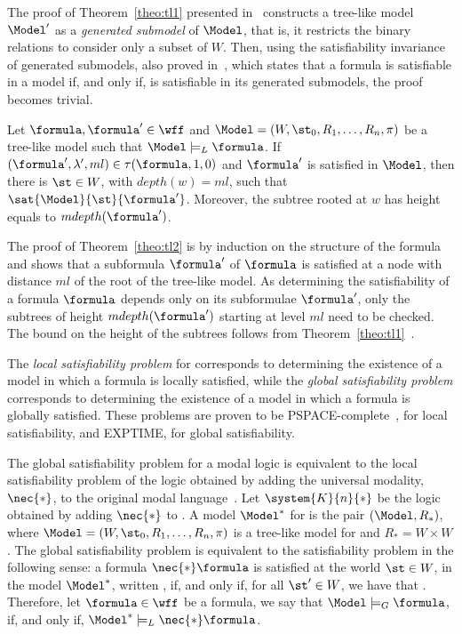 \begin{example}
    The proof of Theorem~\ref{theo:tl1} presented in~\cite{blackburn2002modal}
    constructs a tree-like model $\Model'$ as a \emph{generated submodel} of
    $\Model$, that is, it restricts the binary relations to consider only a
    subset of $W$. Then, using the satisfiability invariance of generated
    submodels, also proved in~\cite{blackburn2002modal}, which states that a
    formula is satisfiable in a model if, and only if, is satisfiable in its
    generated submodels, the proof becomes trivial.

    \begin{theorem}%
        \label{theo:tl2}
        Let $\formula, \formula' \in \wff$ and $\Model = (W, \st_0, R_1, \ldots,
        R_n, \pi)$ be a tree-like model such that $\Model \models_L \formula$. If
        $(\formula', \lambda', ml) \in \tau(\formula, 1, 0)$ and
        $\formula'$ is satisfied in $\Model$, then there is $\st \in W$, with
        $depth(w) = ml$, such that $\sat{\Model}{\st}{\formula'}$. Moreover,
        the subtree rooted at $w$ has height equals to $mdepth(\formula')$.
    \end{theorem}

    The proof of Theorem~\ref{theo:tl2} is by induction on the structure of the
    formula and shows that a subformula $\formula'$ of $\formula$ is satisfied
    at a node with distance $ml$ of the root of the tree-like model. As
    determining the satisfiability of a formula $\formula$ depends only on its
    subformulae $\formula'$, only the subtrees of height $mdepth(\formula')$
    starting at level $ml$ need to be checked. The bound on the height of the
    subtrees follows from Theorem~\ref{theo:tl1}~\cite{nalon2015modal}.
\end{example}

The \emph{local satisfiability problem} for  corresponds to
determining the existence of a model in which a formula is locally satisfied,
while the \emph{global satisfiability problem} corresponds to determining the
existence of a model in which a formula is globally satisfied. These problems
are proven to be PSPACE-complete~\cite{Spaan:coml}, for local satisfiability,
and EXPTIME, for global satisfiability\cite{Spaan:coml}.

The global satisfiability problem for a modal logic is equivalent to the local
satisfiability problem of the logic obtained by adding the universal modality,
$\nec{*}$, to the original modal language~\cite{goranko1992using}. Let
$\system{K}{n}{*}$ be the logic obtained by adding $\nec{*}$ to .
A model $\Model^*$ for  is the pair $(\Model, R_*)$, where
$\Model = (W, \st_0, R_1, \ldots, R_n, \pi)$ is a tree-like model for
 and $R_* = W \times W$. The global satisfiability problem is
equivalent to the satisfiability problem in the following sense: a formula
$\nec{*} \formula$ is satisfied at the world $\st \in W$, in the model
$\Model^*$, written \sat{\Model^*}{\st}{\nec{*}\formula}, if, and only if, for
all $\st' \in W$, we have that . Therefore, let
$\formula \in \wff$ be a formula, we say that $\Model \models_G \formula$, if,
and only if, $\Model^* \models_L \nec{*} \formula$. 

